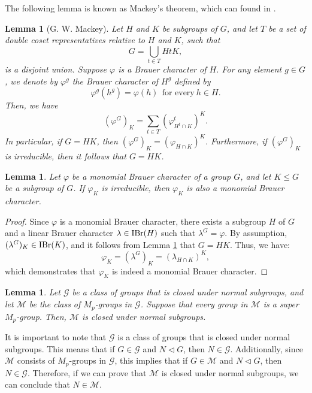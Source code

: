 \documentclass[12pt]{amsart}
\newtheorem{lem}[theorem]{Lemma}
\theoremstyle{remark}
\numberwithin{equation}{section}
\begin{document}
The following lemma is known as  Mackey's theorem,
which can found in \cite[Problem 8.5]{Navarro1998}.


\begin{lem}[G. W. Mackey]\label{lem2.2}
Let $H$ and $K$ be subgroups of $G$, and
let $T$ be a set of double coset representatives relative to $H$ and $K$, such that
$$G=\bigcup_{t\in T}HtK,$$
is a disjoint union. Suppose $\varphi$ is a Brauer character of
$H$. For any element $g\in G$, we denote by $\varphi^{g}$ the Brauer character of
$H^{g}$ defined by $$\varphi^{g}(h^{g})=\varphi(h) \ \ \mbox{for
every} \ h\in H.$$ Then, we have 
$$(\varphi^{G})_{K}=\sum_{t\in T}(\varphi^{t}_{H^{t}\cap K})^{K}.$$
In particular, if $G=HK$, then $(\varphi^{G})_{K}=(\varphi_{H\cap
K})^{K}$. Furthermore, if $(\varphi^{G})_{K}$ is irreducible, then it follows that $G=HK$.
\end{lem}


\begin{lem}\label{lemma2.3}
Let $\varphi$ be a monomial Brauer character of a group $G$, and let $K\leq G$ be a subgroup of $G$.
If $\varphi_{K}$ is irreducible, then $\varphi_{K}$ is also a monomial Brauer character.
\end{lem}

\begin{proof}
Since $\varphi$ is a monomial Brauer character, there exists a subgroup $H$ of $G$ and a linear Brauer character
$\lambda\in {\rm IBr}(H)$ such that $\lambda^{G}=\varphi$.
By assumption, $(\lambda^{G})_{K}\in {\rm IBr}(K)$, and it follows
from Lemma \ref{lem2.2} that $G=HK$. Thus, we have:
$$\varphi_{K}=(\lambda^{G})_{K}=(\lambda_{H\cap K})^{K},$$
which demonstrates that $\varphi_{K}$ is indeed a monomial Brauer character.
\end{proof}


\begin{lem}\label{lemma2.4}
Let $\mathcal{G}$ be a class of groups that is closed under normal subgroups,
and let $\mathcal{M}$ be the class of $M_{p}$-groups in $\mathcal{G}$.
Suppose that every group in $\mathcal{M}$ is a super $M_{p}$-group.
Then, $\mathcal{M}$ is closed under normal subgroups.
\end{lem}

It is important to note that $\mathcal{G}$ is a class of groups that is closed under normal subgroups.
This means that if $G\in \mathcal{G}$ and $N\lhd G$, then $N\in \mathcal{G}$.
Additionally, since $\mathcal{M}$ consists of $M_{p}$-groups in $\mathcal{G}$, 
this implies that if $G\in \mathcal{M}$ and $N\lhd G$, then $N\in \mathcal{G}$. Therefore, 
if we can prove that $\mathcal{M}$ is closed under normal subgroups, we can conclude that 
$N\in \mathcal{M}$.
\end{document}
